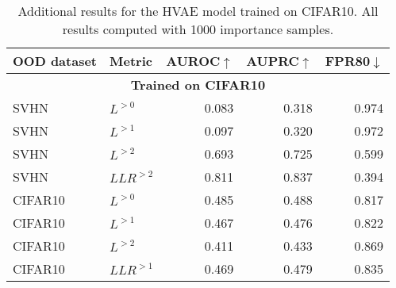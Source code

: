 {\begin{table}[t]
    \centering
    \begin{tabular}{llrrr}
        \toprule
        OOD dataset & Metric & AUROC$\uparrow$ & AUPRC$\uparrow$ & FPR80$\downarrow$ \\
        \midrule
        \multicolumn{5}{c}{\textbf{Trained on CIFAR10}} \\
        \midrule
        SVHN          &  $L^{>0}$    &  0.083  &  0.318  &  0.974  \\
        SVHN          &  $L^{>1}$    &  0.097  &  0.320  &  0.972  \\
        SVHN          &  $L^{>2}$    &  0.693  &  0.725  &  0.599  \\
        SVHN          &  $LLR^{>2}$  &  0.811  &  0.837  &  0.394  \\
\midrule
CIFAR10       &  $L^{>0}$    &  0.485  &  0.488  &  0.817  \\
CIFAR10       &  $L^{>1}$    &  0.467  &  0.476  &  0.822  \\
CIFAR10       &  $L^{>2}$    &  0.411  &  0.433  &  0.869  \\
CIFAR10       &  $LLR^{>1}$  &  0.469  &  0.479  &  0.835  \\
         \bottomrule
    \end{tabular}
    \caption[Additional results for the HVAE model trained on CIFAR10]{Additional results for the HVAE model trained on CIFAR10. All results computed with 1000 importance samples.}
    \label{tab_hierarchical:additional-results-cifar}
\end{table}


}
